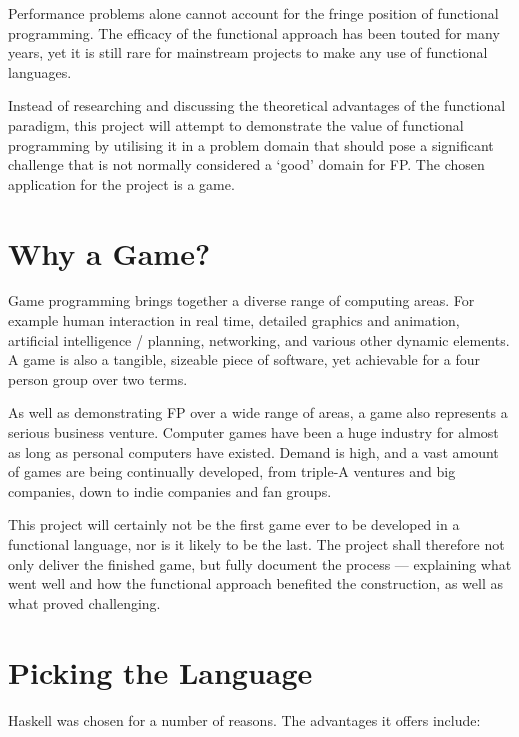 Performance problems alone cannot account for the fringe position of functional programming. The efficacy of the functional approach has been touted for many years, yet it is still rare for mainstream projects to make any use of functional languages.

Instead of researching and discussing the theoretical advantages of the functional paradigm, this project will attempt to demonstrate the value of functional programming by utilising it in a problem domain that should pose a significant challenge that is not normally considered a `good' domain for FP. The chosen application for the project is a game.

\section{Why a Game?}

Game programming brings together a diverse range of computing areas. For example human interaction in real time, detailed graphics and animation, artificial intelligence / planning, networking, and various other dynamic elements. A game is also a tangible, sizeable piece of software, yet achievable for a four person group over two terms.

As well as demonstrating FP over a wide range of areas, a game also represents a serious business venture.\cite{essentialFacts2012} Computer games have been a huge industry for almost as long as personal computers have existed. Demand is high, and a vast amount of games are being continually developed, from triple-A ventures and big companies, down to indie companies and fan groups.

This project will certainly not be the first game ever to be developed in a functional language, nor is it likely to be the last. The project shall therefore not only deliver the finished game, but fully document the process --- explaining what went well and how the functional approach benefited the construction, as well as what proved challenging.

\section{Picking the Language}

Haskell was chosen for a number of reasons. The advantages it offers include:

